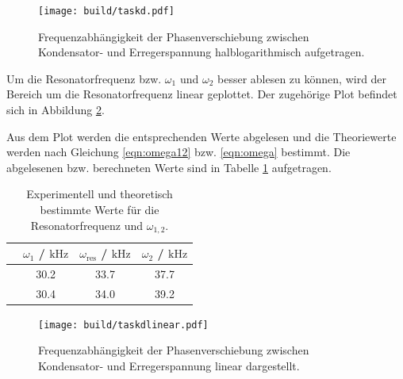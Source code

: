 \begin{figure}
	\centering
	\texttt{[image: build/taskd.pdf]}
	\caption{Frequenzabhängigkeit der Phasenverschiebung zwischen Kondensator- und Erregerspannung halblogarithmisch aufgetragen.}
	\label{fig:phasenplot}
\end{figure}

Um die Resonatorfrequenz bzw. $\omega_1$ und $\omega_2$ besser ablesen zu können, wird der Bereich um die Resonatorfrequenz linear geplottet.
Der zugehörige Plot befindet sich in Abbildung \ref{fig:phasenplotlinear}.

Aus dem Plot werden die entsprechenden Werte abgelesen und die Theoriewerte werden nach Gleichung \eqref{eqn:omega12} bzw. \eqref{eqn:omega} bestimmt.
Die abgelesenen bzw. berechneten Werte sind in Tabelle \ref{tab:senseless_table} aufgetragen.
\begin{table}
	\caption{Experimentell und theoretisch bestimmte Werte für die Resonatorfrequenz und $\omega_{1,2}$.}
	\centering
	\label{tab:senseless_table}
	\begin{tabular}{cccc}
		\toprule
		 &$\omega_1$ / $\si{\kilo\hertz}$ &$\omega_{\mathrm{res}}$ / $\si{\kilo\hertz}$&$\omega_2$ / $\si{\kilo\hertz}$\\
		 \midrule
		 \text{Abgelesen}&30.2&33.7&37.7\\
		 \text{Theoriewert}&30.4&34.0&39.2\\
	\bottomrule
	\end{tabular}
\end{table}
\begin{figure}
	\centering
	\texttt{[image: build/taskdlinear.pdf]}
	\caption{Frequenzabhängigkeit der Phasenverschiebung zwischen Kondensator- und Erregerspannung linear dargestellt.}
	\label{fig:phasenplotlinear}
\end{figure}
